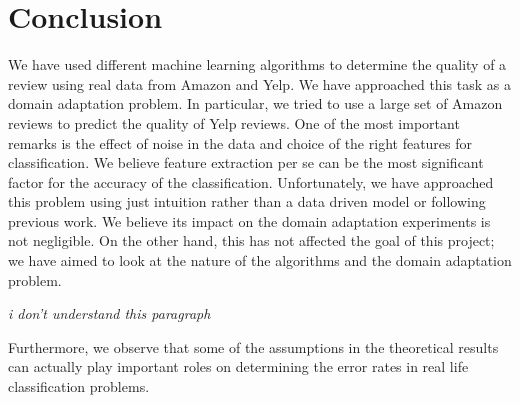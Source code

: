 \documentclass[letterpaper]{article}
\begin{document}
\section{Conclusion}
\label{sec:conclusion}
We have used different machine learning algorithms to determine the
quality of a review using real data from Amazon and Yelp. We have
approached this task as a domain adaptation problem. In particular, we
tried to use a large set of Amazon reviews to predict the quality of
Yelp reviews. One of the most important remarks is the effect of noise
in the data and choice of the right features for classification. We
believe feature extraction per se can be the most significant factor
for the accuracy of the classification. Unfortunately, we have
approached this problem using just intuition rather than a data driven
model or following previous work.  We believe its impact on the domain
adaptation experiments is not negligible. On the other hand, this has
not affected the goal of this project; we have aimed to look at the
nature of the algorithms and the domain adaptation
problem. 

\emph{i don't understand this paragraph}

Furthermore, we observe that some of the assumptions in the
theoretical results can actually play important roles on determining
the error rates in real life classification problems.



\end{document}
